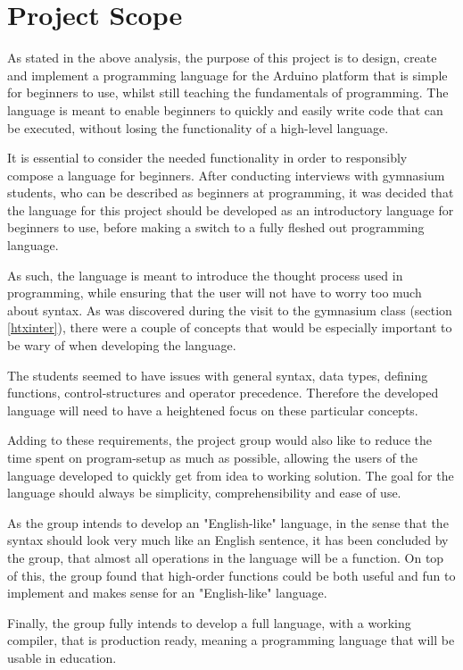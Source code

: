 \section{Project Scope}
As stated in the above analysis, the purpose of this project is to design, create and implement a programming language for the Arduino platform that is simple for beginners to use, whilst still teaching the fundamentals of programming.
The language is meant to enable beginners to quickly and easily write
code that can be executed, without losing the functionality of a high-level language.

It is essential to consider the needed functionality in order to responsibly compose a language for beginners.
After conducting interviews with gymnasium students, who can be described as beginners at programming, it was decided that the language for this project should be developed as an introductory language for beginners to use, before making a switch to a fully fleshed out programming language.

As such, the language is meant to introduce the thought process used in programming, while ensuring that the user will not have to worry too much about syntax.
As was discovered during the visit to the gymnasium class (section \ref{htxinter}), there were a couple of concepts that would be especially important to be wary of when developing the language.

The students seemed to have issues with general syntax, data types, defining functions, control-structures and operator precedence.
Therefore the developed language will need to have a heightened focus on these particular concepts. 

Adding to these requirements, the project group would also like to reduce the time spent on program-setup as much as possible, allowing the users of the language developed to quickly get from idea to working solution.
The goal for the language should always be simplicity, comprehensibility and ease of use.

As the group intends to develop an "English-like" language, in the sense that the syntax should look very much like an English sentence, it has been concluded by the group, that almost all operations in the language will be a function. 
On top of this, the group found that high-order functions could be both useful and fun to implement and makes sense for an "English-like" language. 

Finally, the group fully intends to develop a full language, with a working compiler, that is production ready, meaning a programming language that will be usable in education.

 
